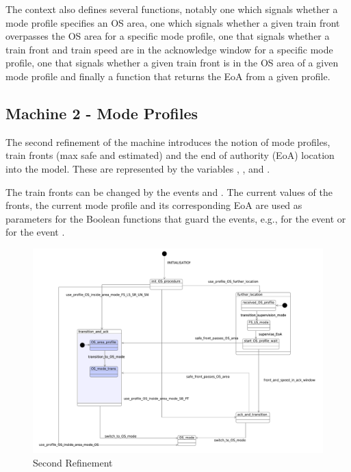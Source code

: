 \documentclass{template/openetcs_article}
\begin{document}
The context also defines several functions, notably one which signals whether a
mode profile specifies an OS area, one which signals whether a given train front
overpasses the OS area for a specific mode profile, one that signals whether a
train front and train speed are in the acknowledge window for a specific mode
profile, one that signals whether a given train front is in the OS area of a
given mode profile and finally a function that returns the EoA from a given
profile.

{\footnotesize

}

\subsection{Machine 2 - Mode Profiles}
\label{sec:machine-2-mode}

The second refinement of the machine introduces the notion of mode profiles,
train fronts (max safe and estimated) and the end of authority (EoA) location
into the model. These are represented by the variables ,
,  and
.

The train fronts can be changed by the events 
and . The current values of the fronts, the current
mode profile and its corresponding EoA are used as parameters for the Boolean
functions that guard the events, e.g., for the event
 or for the event
.

\begin{figure}[ht]
  \centering
  \includegraphics[width=.95\textwidth]{m2_mode_profile_on_sight_procedure}
  \caption{Second Refinement}
  \label{fig:second-refinement}
\end{figure}
\end{document}
